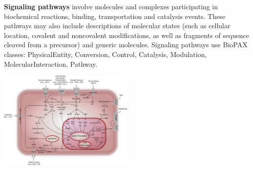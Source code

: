 \begin{frame}
\begin{block}{\textbf{Signaling pathways}}
involve molecules and complexes participating in biochemical reactions, binding, transportation and catalysis events. These pathways may also include descriptions of molecular states (such as cellular location, covalent and noncovalent modifications, as well as fragments of sequence cleaved from a precursor) and generic molecules. Signaling pathways use BioPAX classes: PhysicalEntity, Conversion, Control, Catalysis, Modulation, MolecularInteraction, Pathway.
\end{block}
\begin{center}
\includegraphics[width=0.5\textwidth]{fig/SignalingPathways.pdf}
\end{center}
\end{frame}
